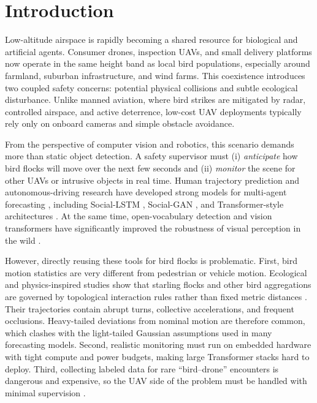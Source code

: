 \documentclass[journal]{IEEEtran}
\begin{document}
\section{Introduction}
\label{sec:intro}

Low-altitude airspace is rapidly becoming a shared resource for biological and artificial agents. Consumer drones, inspection UAVs, and small delivery platforms now operate in the same height band as local bird populations, especially around farmland, suburban infrastructure, and wind farms. This coexistence introduces two coupled safety concerns: potential physical collisions and subtle ecological disturbance. Unlike manned aviation, where bird strikes are mitigated by radar, controlled airspace, and active deterrence, low-cost UAV deployments typically rely only on onboard cameras and simple obstacle avoidance.

From the perspective of computer vision and robotics, this scenario demands more than static object detection. A safety supervisor must (i) \emph{anticipate} how bird flocks will move over the next few seconds and (ii) \emph{monitor} the scene for other UAVs or intrusive objects in real time. Human trajectory prediction and autonomous-driving research have developed strong models for multi-agent forecasting \cite{Rudenko2020Survey}, including Social-LSTM \cite{Alahi2016SocialLSTM}, Social-GAN \cite{Gupta2018SocialGAN}, and Transformer-style architectures \cite{Giuliari2021Transformer,Yuan2021AgentFormer,Liu2022HiVT}. At the same time, open-vocabulary detection and vision transformers have significantly improved the robustness of visual perception in the wild \cite{Minderer2022OWLViT,Chen2023GroundingDINO,Dosovitskiy2021ViT}.

However, directly reusing these tools for bird flocks is problematic. First, bird motion statistics are very different from pedestrian or vehicle motion. Ecological and physics-inspired studies show that starling flocks and other bird aggregations are governed by topological interaction rules rather than fixed metric distances \cite{Ballerini2008Interaction,Cavagna2010ScaleFree,Giardina2008Collective}. Their trajectories contain abrupt turns, collective accelerations, and frequent occlusions. Heavy-tailed deviations from nominal motion are therefore common, which clashes with the light-tailed Gaussian assumptions used in many forecasting models. Second, realistic monitoring must run on embedded hardware with tight compute and power budgets, making large Transformer stacks hard to deploy. Third, collecting labeled data for rare ``bird--drone'' encounters is dangerous and expensive, so the UAV side of the problem must be handled with minimal supervision \cite{Chen2020BirdUAV}.
\end{document}
